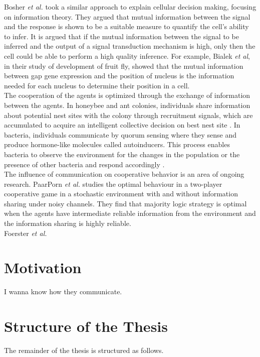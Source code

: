Bosher \textit{et al.} \cite{Bowsher2014} took a similar approach to explain cellular decision making, focusing on information theory. They argued that mutual information between the signal and the response is shown to be a suitable measure to quantify the cell's ability to infer. It is argued that if the mutual information between the signal to be inferred and the output of a signal transduction mechanism is high, only then the cell could be able to perform a high quality inference. For example, Bialek \textit{et al}, in their study of development of fruit fly, showed that the mutual information between gap gene expression and the position of nucleus is the information needed for each nucleus to determine their position in a cell. \\
The cooperation of the agents is optimized through the exchange of information between the agents. In honeybee and ant colonies, individuals share information about potential nest sites with the colony through recruitment signals, which are accumulated to acquire an intelligent collective decision on best nest site \cite{Franks2002}. In bacteria, individuals communicate by quorum sensing where they sense and produce hormone-like molecules called autoinducers. This process enables bacteria to observe the environment for the changes in the population or the presence of other bacteria and respond accordingly \cite{doi:10.1146/annurev.cellbio.21.012704.131001}.\\
The influence of communication on cooperative behavior is an area of ongoing research. PaarPorn \textit{et al.} \cite{Paarporn2018a} studies the optimal behaviour in a two-player cooperative game in a stochastic environment with and without information sharing under noisy channels. They find that majority logic strategy is optimal when the agents have intermediate reliable information from the environment and the information sharing is highly reliable. \\
Foerster \textit{et al.} \cite{Foerster2016}

\section{Motivation}

I wanna know how they communicate.


\section{Structure of the Thesis}
The remainder of the thesis is structured as follows.

